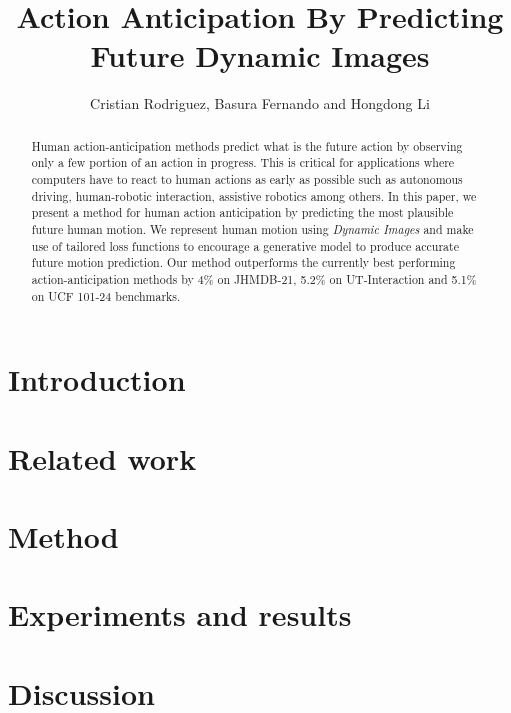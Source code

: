 \documentclass[runningheads]{llncs}
\begin{document}
\pagestyle{headings}
\mainmatter
\def\ECCV18SubNumber{6}  %

\title{Action Anticipation By Predicting Future Dynamic Images} %



\author{Cristian Rodriguez, Basura Fernando and Hongdong Li}


\maketitle

\begin{abstract}
Human action-anticipation methods predict what is the future action by observing only a few portion of an action in progress.
This is critical for applications where computers have to react to human actions as early as possible such as autonomous driving, human-robotic interaction, assistive robotics among others.
In this paper, we present a method for human action anticipation by predicting the most plausible future human motion.  
We represent human motion using {\em Dynamic Images} \cite{bilen2016dynamic} and make use of tailored loss functions to encourage a generative model to produce accurate future motion prediction. 
Our method outperforms the currently best performing action-anticipation methods by 4\% on JHMDB-21, 5.2\% on UT-Interaction and 5.1\% on UCF 101-24 benchmarks.
\end{abstract}

\section{Introduction}

\section{Related work}

\section{Method}

\section{Experiments and results}

\section{Discussion}





\end{document}
